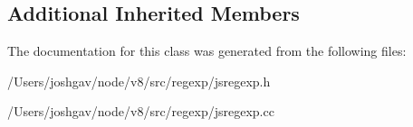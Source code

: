 \subsection*{Additional Inherited Members}


The documentation for this class was generated from the following files\+:\begin{DoxyCompactItemize}
\item 
/\+Users/joshgav/node/v8/src/regexp/jsregexp.\+h\item 
/\+Users/joshgav/node/v8/src/regexp/jsregexp.\+cc\end{DoxyCompactItemize}
